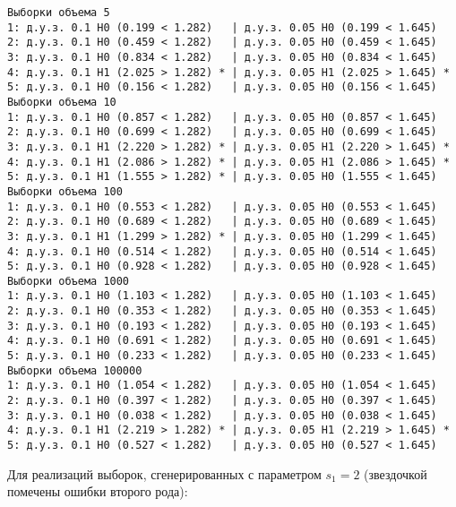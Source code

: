 \documentclass[11pt]{article}
\begin{document}
{\fontsize{11}{11}
    \begin{Verbatim}[commandchars=\\\{\}]
Выборки объема 5
1: д.у.з. 0.1 H0 (0.199 < 1.282)   | д.у.з. 0.05 H0 (0.199 < 1.645) 
2: д.у.з. 0.1 H0 (0.459 < 1.282)   | д.у.з. 0.05 H0 (0.459 < 1.645) 
3: д.у.з. 0.1 H0 (0.834 < 1.282)   | д.у.з. 0.05 H0 (0.834 < 1.645) 
4: д.у.з. 0.1 H1 (2.025 > 1.282) * | д.у.з. 0.05 H1 (2.025 > 1.645) *
5: д.у.з. 0.1 H0 (0.156 < 1.282)   | д.у.з. 0.05 H0 (0.156 < 1.645) 
Выборки объема 10
1: д.у.з. 0.1 H0 (0.857 < 1.282)   | д.у.з. 0.05 H0 (0.857 < 1.645) 
2: д.у.з. 0.1 H0 (0.699 < 1.282)   | д.у.з. 0.05 H0 (0.699 < 1.645) 
3: д.у.з. 0.1 H1 (2.220 > 1.282) * | д.у.з. 0.05 H1 (2.220 > 1.645) *
4: д.у.з. 0.1 H1 (2.086 > 1.282) * | д.у.з. 0.05 H1 (2.086 > 1.645) *
5: д.у.з. 0.1 H1 (1.555 > 1.282) * | д.у.з. 0.05 H0 (1.555 < 1.645) 
Выборки объема 100
1: д.у.з. 0.1 H0 (0.553 < 1.282)   | д.у.з. 0.05 H0 (0.553 < 1.645) 
2: д.у.з. 0.1 H0 (0.689 < 1.282)   | д.у.з. 0.05 H0 (0.689 < 1.645) 
3: д.у.з. 0.1 H1 (1.299 > 1.282) * | д.у.з. 0.05 H0 (1.299 < 1.645) 
4: д.у.з. 0.1 H0 (0.514 < 1.282)   | д.у.з. 0.05 H0 (0.514 < 1.645) 
5: д.у.з. 0.1 H0 (0.928 < 1.282)   | д.у.з. 0.05 H0 (0.928 < 1.645) 
Выборки объема 1000
1: д.у.з. 0.1 H0 (1.103 < 1.282)   | д.у.з. 0.05 H0 (1.103 < 1.645) 
2: д.у.з. 0.1 H0 (0.353 < 1.282)   | д.у.з. 0.05 H0 (0.353 < 1.645) 
3: д.у.з. 0.1 H0 (0.193 < 1.282)   | д.у.з. 0.05 H0 (0.193 < 1.645) 
4: д.у.з. 0.1 H0 (0.691 < 1.282)   | д.у.з. 0.05 H0 (0.691 < 1.645) 
5: д.у.з. 0.1 H0 (0.233 < 1.282)   | д.у.з. 0.05 H0 (0.233 < 1.645) 
Выборки объема 100000
1: д.у.з. 0.1 H0 (1.054 < 1.282)   | д.у.з. 0.05 H0 (1.054 < 1.645) 
2: д.у.з. 0.1 H0 (0.397 < 1.282)   | д.у.з. 0.05 H0 (0.397 < 1.645) 
3: д.у.з. 0.1 H0 (0.038 < 1.282)   | д.у.з. 0.05 H0 (0.038 < 1.645) 
4: д.у.з. 0.1 H1 (2.219 > 1.282) * | д.у.з. 0.05 H1 (2.219 > 1.645) *
5: д.у.з. 0.1 H0 (0.527 < 1.282)   | д.у.з. 0.05 H0 (0.527 < 1.645)
\end{Verbatim}
}

    Для реализаций выборок, сгенерированных с параметром \(s_1=2\)
(звездочкой помечены ошибки второго рода):
\end{document}
